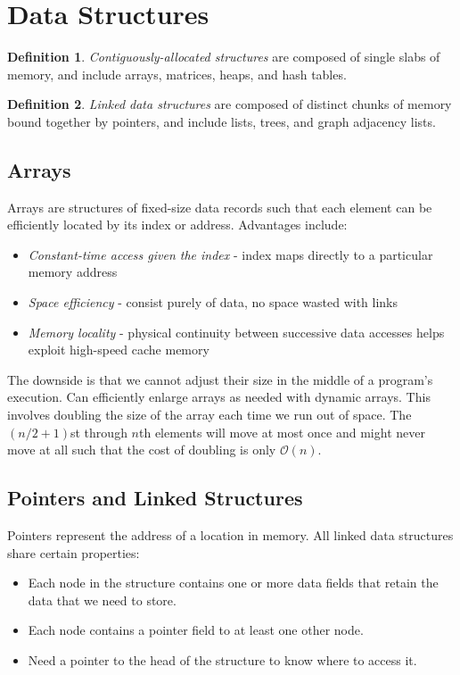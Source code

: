 \documentclass[10pt]{article}
\theoremstyle{definition}
\newtheorem*{definition}{Definition}
\begin{document}
\maketitle
\lstset{language=Python}
	
\section{Data Structures}
\begin{definition}
    \textit{Contiguously-allocated structures} are composed of single slabs of memory, and include arrays, matrices, heaps, and hash tables.
\end{definition}
\begin{definition}
    \textit{Linked data structures} are composed of distinct chunks of memory bound together by pointers, and include lists, trees, and graph adjacency lists.
\end{definition}
\subsection{Arrays}
Arrays are structures of fixed-size data records such that each element can be efficiently located by its index or address. Advantages include:
\begin{itemize}
    \item \textit{Constant-time access given the index} - index maps directly to a particular memory address
    \item \textit{Space efficiency} - consist purely of data, no space wasted with links
    \item \textit{Memory locality} - physical continuity between successive data accesses helps exploit high-speed cache memory
\end{itemize}
The downside is that we cannot adjust their size in the middle of a program's execution. Can efficiently enlarge arrays as needed with dynamic arrays. This involves doubling the size of the array each time we run out of space. The $(n/2 + 1)$st through $n$th elements will move at most once and might never move at all such that the cost of doubling is only $\mathcal{O}(n)$.
\subsection{Pointers and Linked Structures}
Pointers represent the address of a location in memory. All linked data structures share certain properties:
\begin{itemize}
    \item Each node in the structure contains one or more data fields that retain the data that we need to store.
    \item Each node contains a pointer field to at least one other node.
    \item Need a pointer to the head of the structure to know where to access it.
\end{itemize}
\end{document}
